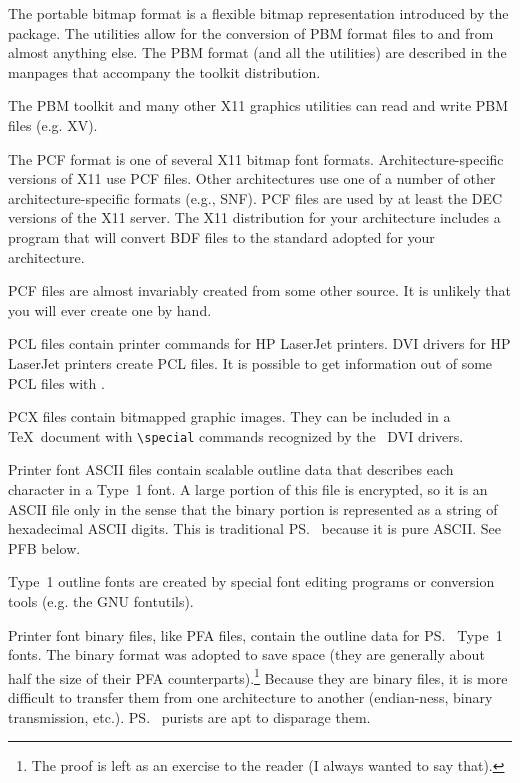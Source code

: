 \begin{iplist}{.25in}
\extitem [pbm] The portable bitmap format is a flexible bitmap
representation introduced by the  package.  The 
utilities allow for the conversion of PBM format files to and from
almost anything else.  The PBM format (and all the utilities) are
described in the manpages that accompany the  toolkit
distribution.

The PBM toolkit and many other X11 graphics utilities can read and
write PBM files (e.g. XV).

\extitem [pcf] The PCF format is one of several X11 bitmap font formats.
Architecture-specific versions of X11 use PCF files.  Other architectures use
one of a number of other architecture-specific formats (e.g., SNF).  PCF files
are used by at least the DEC versions of the X11 server.  The X11
distribution for your architecture includes a program that will convert BDF
files to the standard adopted for your architecture.

PCF files are almost invariably created from some other source.
It is unlikely that you will ever create one by hand.

\extitem [pcl] PCL files contain printer commands for HP LaserJet printers.
DVI drivers for HP LaserJet printers create PCL files.  It is possible to
get information out of some PCL files with .

\extitem [pcx] PCX files contain bitmapped graphic images.  They
can be included in a \TeX\ document with \verb|\special| commands recognized
by the \emTeX\ DVI drivers.

\extitem [pfa] Printer font ASCII files contain scalable outline data that
describes each character in a Type~1 font.  A large portion of this file is
encrypted, so it is an ASCII file only in the sense that the binary portion
is represented as a string of hexadecimal ASCII digits.  This is
traditional \ps\ because it is pure ASCII.  See PFB below.

Type~1 outline fonts are created by special font editing programs or
conversion tools (e.g. the GNU fontutils).

\extitem [pfb] Printer font binary files, like PFA files, contain the
outline data for \ps\ Type~1 fonts.  The binary format was adopted to save
space (they are generally about half the size of their PFA
counterparts).\footnote{The proof is left as an exercise to the reader (I
always wanted to say that).}
Because they are binary files, it is more difficult to transfer them from
one architecture to another (endian-ness, binary transmission, etc.).  \ps\
purists are apt to disparage them.


\end{iplist}
